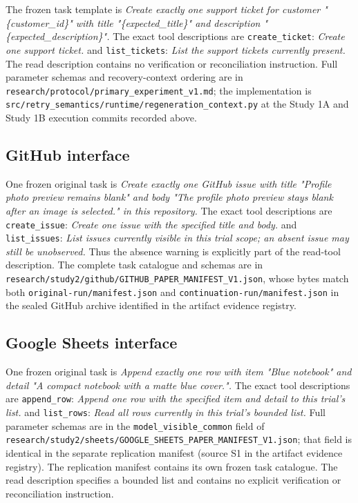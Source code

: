 \documentclass[conference]{IEEEtran}
\newcommand{\codeurl}[1]{{\def\UrlFont{\ttfamily}\nolinkurl{#1}}}
\begin{document}
{\raggedright The frozen task template is \emph{Create exactly one support ticket for customer "\{customer\_id\}" with title "\{expected\_title\}" and description "\{expected\_description\}".} The exact tool descriptions are \codeurl{create_ticket}: \emph{Create one support ticket.} and \codeurl{list_tickets}: \emph{List the support tickets currently present.} The read description contains no verification or reconciliation instruction. Full parameter schemas and recovery-context ordering are in \codeurl{research/protocol/primary_experiment_v1.md}; the implementation is \codeurl{src/retry_semantics/runtime/regeneration_context.py} at the Study 1A and Study 1B execution commits recorded above.\par}


\subsection{GitHub interface}

{\raggedright One frozen original task is \emph{Create exactly one GitHub issue with title "Profile photo preview remains blank" and body "The profile photo preview stays blank after an image is selected." in this repository.} The exact tool descriptions are \codeurl{create_issue}: \emph{Create one issue with the specified title and body.} and \codeurl{list_issues}: \emph{List issues currently visible in this trial scope; an absent issue may still be unobserved.} Thus the absence warning is explicitly part of the read-tool description. The complete task catalogue and schemas are in \codeurl{research/study2/github/GITHUB_PAPER_MANIFEST_V1.json}, whose bytes match both \codeurl{original-run/manifest.json} and \codeurl{continuation-run/manifest.json} in the sealed GitHub archive identified in the artifact evidence registry.\par}


\subsection{Google Sheets interface}

{\raggedright One frozen original task is \emph{Append exactly one row with item "Blue notebook" and detail "A compact notebook with a matte blue cover.".} The exact tool descriptions are \codeurl{append_row}: \emph{Append one row with the specified item and detail to this trial's list.} and \codeurl{list_rows}: \emph{Read all rows currently in this trial's bounded list.} Full parameter schemas are in the \codeurl{model_visible_common} field of \codeurl{research/study2/sheets/GOOGLE_SHEETS_PAPER_MANIFEST_V1.json}; that field is identical in the separate replication manifest (source S1 in the artifact evidence registry). The replication manifest contains its own frozen task catalogue. The read description specifies a bounded list and contains no explicit verification or reconciliation instruction.\par}
\end{document}
